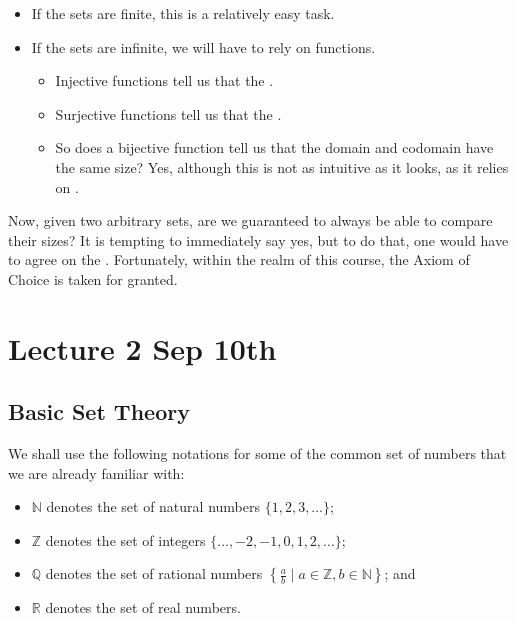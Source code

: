 \documentclass[notoc,notitlepage]{tufte-book}
\begin{document}
\begin{itemize}
  \item If the sets are finite, this is a relatively easy task.
  \item If the sets are infinite, we will have to rely on functions.
    \begin{itemize}
      \item Injective functions tell us that the .
      \item Surjective functions tell us that the .
      \item So does a bijective function tell us that the domain and codomain have the same size? Yes, although this is not as intuitive as it looks, as it relies on .
    \end{itemize}
\end{itemize}

Now, given two arbitrary sets, are we guaranteed to always be able to compare their sizes? It is tempting to immediately say yes, but to do that, one would have to agree on the . Fortunately, within the realm of this course, the Axiom of Choice is taken for granted.



\chapter{Lecture 2 Sep 10th}%
\label{chp:lecture_2_sep_10th}

\section{Basic Set Theory}%
\label{sec:basic_set_theory}

We shall use the following notations for some of the common set of numbers that we are already familiar with:
\begin{itemize}
  \item $\mathbb{N}$ denotes the set of natural numbers $\{1, 2, 3, \ldots\}$;
  \item $\mathbb{Z}$ denotes the set of integers $\{\ldots, -2, -1, 0, 1, 2, \ldots\}$;
  \item $\mathbb{Q}$ denotes the set of rational numbers $\left\{ \frac{a}{b} \mid a \in \mathbb{Z}, b \in \mathbb{N} \right\}$; and
  \item $\mathbb{R}$ denotes the set of real numbers.
\end{itemize}
\end{document}
